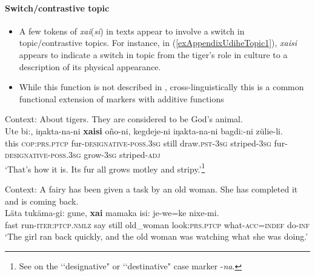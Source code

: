 \paragraph{Switch/contrastive topic}\label{appendixUdiheTopic}
\begin{itemize}
	\item A few tokens of \mbox{\textit{xai}(\textit{si})} in texts appear to involve a switch in topic/contrastive topics. For instance, in (\ref{exAppendixUdiheTopic1}), \textit{xaisi} appears to indicate a switch in topic from the tiger's role in culture to a description of its physical appearance.
	\item While this function is not described in \textcite{NikolaevaTolskaya2001}, cross-linguistically this is a common functional extension of markers with additive functions \parencite{Forker2016} 
\end{itemize}

\begin{exe}

	\ex\label{exAppendixUdiheTopic1}
	 Context: About tigers. They are considered to be God’s animal.\\
	\gll Ute bi:, iŋakta-na-ni \textbf{xaisi} oño-ni, kegdeje-ni iŋakta-na-ni bagdi:-ni zülie-li.\\
	this \textsc{cop}:\textsc{prs}.\textsc{ptcp} fur-\textsc{designative}-\textsc{poss}.3\textsc{sg} still draw.\textsc{pst}-3\textsc{sg} striped-3\textsc{sg} fur-\textsc{designative}-\textsc{poss}.3\textsc{sg} grow-3\textsc{sg} striped-\textsc{adj}\\
	\glt \lq That’s how it is. Its fur all grows motley and stripy.'\footnote{See \textcite[126–127]{NikolaevaTolskaya2001} on the \lq\lq designative" or \lq\lq destinative" case marker \mbox{-\textit{na}}.}  \parencite[The tiger for the Udihe people]{NikolaevaEtAl2019}

	
	\ex Context: A fairy has been given a task by an old woman. She has completed it and is coming back.\\
	\gll Läta tukäma-gi: gune, \textbf{xai} mamaka isi: je-we=ke nixe-mi.\\
	fast run-\textsc{iter}:\textsc{ptcp}.\textsc{nmlz} say still old\_woman look:\textsc{prs}.\textsc{ptcp} what-\textsc{acc}=\textsc{indef} do-\textsc{inf}\\
	\glt \lq The girl ran back quickly, and the old woman was watching what she was doing.'  \parencite[The fairy and the ten bald spirits]{NikolaevaEtAl2019}

\end{exe}

